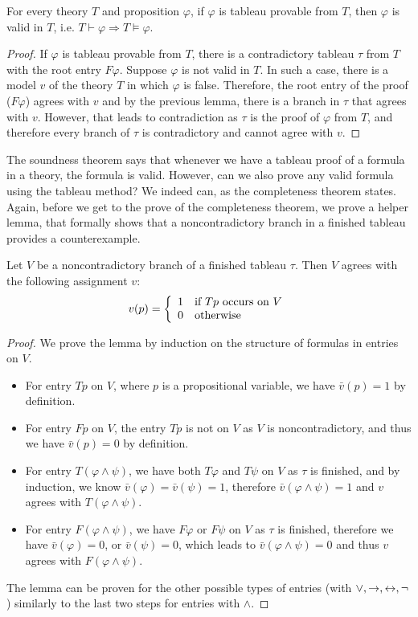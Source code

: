 \begin{theorem}
For every theory $T$ and proposition $\varphi$, if $\varphi$ is tableau provable from $T$, then $\varphi$ is valid in $T$, i.e. $T \vdash \varphi \Rightarrow T \vDash \varphi$.
\end{theorem}
\begin{proof}
If $\varphi$ is tableau provable from $T$, there is a contradictory tableau $\tau$ from $T$ with the root entry $F \varphi$. Suppose $\varphi$ is not valid in $T$. In such a case, there is a model $v$ of the theory $T$ in which $\varphi$ is false. Therefore, the root entry of the proof ($F \varphi$) agrees with $v$ and by the previous lemma, there is a branch in $\tau$ that agrees with $v$. However, that leads to contradiction as $\tau$ is the proof of $\varphi$ from $T$, and therefore every branch of $\tau$ is contradictory and cannot agree with $v$.
\end{proof}

The soundness theorem says that whenever we have a tableau proof of a formula in a theory, the formula is valid. However, can we also prove any valid formula using the tableau method? We indeed can, as the completeness theorem states. Again, before we get to the prove of the completeness theorem, we prove a helper lemma, that formally shows that a noncontradictory branch in a finished tableau provides a counterexample.

\begin{lemma}
Let $V$ be a noncontradictory branch of a finished tableau $\tau$. Then $V$ agrees with the following assignment $v$: $$v(p) = \left\{ \begin{array}{ll} 1 & \text{if } Tp \text{ occurs on } V \\ 0 & \text{otherwise} \end{array} \right.$$
\end{lemma}
\begin{proof}
We prove the lemma by induction on the structure of formulas in entries on $V$.
\begin{itemize}
 \item For entry $T p$ on $V$, where $p$ is a propositional variable, we have $\bar{v}(p)= 1$ by definition.
 \item For entry $F p$ on $V$, the entry $T p$ is not on $V$ as $V$ is noncontradictory, and thus we have $\bar{v}(p) = 0$ by definition.
 \item For entry $T (\varphi \land \psi)$, we have both $T \varphi$ and $T \psi$ on $V$ as $\tau$ is finished, and by induction, we know $\bar{v}(\varphi)=\bar{v}(\psi)=1$, therefore $\bar{v}(\varphi \land \psi)=1$ and $v$ agrees with $T (\varphi \land \psi)$.
 \item For entry $F (\varphi \land \psi)$, we have $F \varphi$ or $F \psi$ on $V$ as $\tau$ is finished, therefore we have $\bar{v}(\varphi) = 0$, or $\bar{v}(\psi) = 0$, which leads to $\bar{v}(\varphi \land \psi) = 0$ and thus $v$ agrees with $F (\varphi \land \psi)$.
\end{itemize}

The lemma can be proven for the other possible types of entries (with $\lor, \to, \leftrightarrow, \neg$) similarly to the last two steps for entries with $\land$.
\end{proof}

